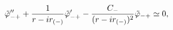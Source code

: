 \begin{equation}
{\tilde \varphi_{-+}}''
+ {1 \over {r-ir_{(-)}}} {\tilde \varphi_{-+}}'
- {C_- \over {(r-ir_{(-)})^2}}{\tilde \varphi_{-+}}
\simeq 0,
\label{eq_approx_rmp}
\end{equation}

